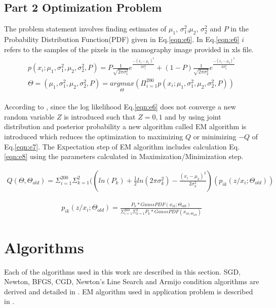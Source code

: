 \documentclass[paper=a4, fontsize=11pt]{scrartcl}
\numberwithin{equation}{section}		%
\numberwithin{figure}{section}			%
\numberwithin{table}{section}				%
\begin{document}
\subsection{Part 2 Optimization Problem}
The problem statement involves finding estimates of $\mu_1$, $\sigma_1^2$,$\mu_2$, $\sigma_2^2$ and $P$ in the Probability Distribution Function(PDF) given in Eq.\ref{eqn:e6}. In Eq.\ref{eqn:e6} $i$ refers to the samples of the pixels in the mamography image provided in xls file.
\begin{align}
\label{eqn:e6}
\begin{split}
 p(x_i;\mu_1,\sigma_1^2,\mu_2,\sigma_2^2,P)= P \frac{1}{\sqrt{2\pi\sigma_1^2}} e^{\frac{-(x_i-\mu_1)^2}{2 \sigma_1^2}}+(1-P) \frac{1}{\sqrt{2\pi\sigma_2^2}} e^{\frac{-(x_i-\mu_2)^2}{2 \sigma_2^2}}
\\
 \Theta=(\mu_1,\sigma_1^2,\mu_2,\sigma_2^2,P)=\underset{\Theta}{argmax} (\Pi_{i=1}^{200} p(x_i;\mu_1,\sigma_1^2,\mu_2,\sigma_2^2,P))
\end{split}
\end{align}

According to \cite{two}, since the log likelihood Eq.\ref{eqn:e6} does not converge a new random variable $Z$ is introduced such that $Z={0,1}$ and by using joint distribution and posterior probability a new algorithm called EM algorithm is introduced which reduces the optimization to maximizing $Q$ or minimizing $-Q$ of Eq.\ref{eqn:e7}. The Expectation step of EM algorithm includes calculation Eq.\ref{eqn:e8} using the parameters calculated in Maximization/Minimization step.
 
\begin{align}
\label{eqn:e7}
Q(\Theta,\Theta_{old})=\Sigma_{i=1}^{200}\Sigma_{k=1}^{2}((ln(P_k)+\frac{1}{2}ln(2\pi\sigma_k^2)-\frac{(x_i-\mu_k)^2}{2\sigma_k^2})(p_{ik}(z/x_i;\Theta_{old}))
\end{align}

\begin{align}
\label{eqn:e8}
p_{ik}(z/x_i;\Theta_{old})=\frac{P_k*GaussPDF(x_{ik};\Theta_{old})}{\Sigma_{i=1}^{200}\Sigma_{k=1}^{2}P_k*GaussPDF(x_{ik;\Theta_{old}})}
\end{align}

\section{Algorithms}
Each of the algorithms used in this work are described in this section. SGD, Newton, BFGS, CGD, Newton's Line Search and Armijo condition algorithms are derived and detailed in \cite{one}. EM algorithm used in application problem is described in \cite{two}.
\end{document}
